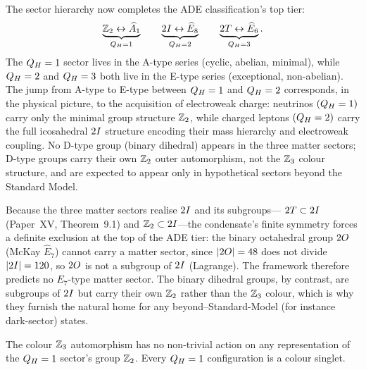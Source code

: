 \begin{remark}
\label{P17:rem:ade_structure}
The sector hierarchy now completes the ADE classification's top tier:
\[
  \underbrace{\mathbb{Z}_2\leftrightarrow\widehat{A}_1}_{Q_H=1}
  \qquad
  \underbrace{2I\leftrightarrow\widehat{E}_8}_{Q_H=2}
  \qquad
  \underbrace{2T\leftrightarrow\widehat{E}_6}_{Q_H=3}.
\]
The $\QH=1$ sector lives in the A-type series (cyclic, abelian,
minimal), while $Q_H=2$ and $Q_H=3$ both live in the E-type series
(exceptional, non-abelian). The jump from A-type to E-type between
$\QH=1$ and $Q_H=2$ corresponds, in the physical picture, to the
acquisition of electroweak charge: neutrinos $(Q_H=1)$ carry only the
minimal group structure $\mathbb{Z}_2$, while charged leptons $(Q_H=2)$ carry
the full icosahedral $2I$ structure encoding their mass hierarchy
and electroweak coupling. No D-type group (binary dihedral) appears
in the three matter sectors; D-type groups carry their own $\mathbb{Z}_2$
outer automorphism, not the $\mathbb{Z}_3$ colour structure, and are
expected to appear only in hypothetical sectors beyond the Standard
Model.

Because the three matter sectors realise $2I$ and its subgroups---%
$2T\subset2I$ (Paper~XV, Theorem~9.1) and $\mathbb{Z}_2\subset2I$---the
condensate's finite symmetry forces a definite exclusion at the top of
the ADE tier: the binary octahedral group $2O$ (McKay $\widehat{E}_7$)
cannot carry a matter sector, since $|2O|=48$ does not divide
$|2I|=120$, so $2O$ is not a subgroup of $2I$ (Lagrange). The
framework therefore predicts no $E_7$-type matter sector. The binary
dihedral groups, by contrast, are subgroups of $2I$ but carry their
own $\mathbb{Z}_2$ rather than the $\mathbb{Z}_3$ colour, which is why they furnish
the natural home for any beyond--Standard-Model (for instance
dark-sector) states.
\end{remark}

\begin{corollary}[Colour exclusion in $\QH=1$]
\label{P17:cor:qh1_colour_free}
The colour $\mathbb{Z}_3$ automorphism has no non-trivial action on any
representation of the $\QH=1$ sector's group $\mathbb{Z}_2$. Every $\QH=1$
configuration is a colour singlet.
\end{corollary}

